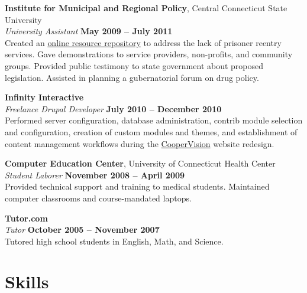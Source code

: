 \documentclass[margin,line]{resume}
\begin{document}
\begin{resume}
    \textbf{Institute for Municipal and Regional Policy}, Central Connecticut State University \vspace{2mm}\\\vspace{1mm}%
    \textsl{University Assistant} \hfill \textbf{May 2009 -- July 2011}\\
    Created an \href{http://www.ctreentry.info}{online resource repository} to address the lack of prisoner reentry services. Gave demonstrations to service providers, non-profits, and community groups. Provided public testimony to state government about proposed legislation. Assisted in planning a gubernatorial forum on drug policy.

    \textbf{Infinity Interactive} \vspace{2mm}\\\vspace{1mm}%
    \textsl{Freelance Drupal Developer} \hfill \textbf{July 2010 -- December 2010}\\
    Performed server configuration, database administration, contrib module selection and configuration, creation of custom modules and themes, and establishment of content management workflows during the \href{http://www.coopervision.com}{CooperVision} website redesign.

    \textbf{Computer Education Center}, University of Connecticut Health Center\vspace{2mm}\\\vspace{1mm}%
    \textsl{Student Laborer} \hfill \textbf{November 2008 -- April 2009}\\
    Provided technical support and training to medical students. Maintained computer classrooms and course-mandated laptops.

    \textbf{Tutor.com}\vspace{2mm}\\\vspace{1mm}%
    \textsl{Tutor} \hfill \textbf{October 2005 -- November 2007}\\
    Tutored high school students in English, Math, and Science.

    \section{\mysidestyle Skills} 


\end{resume}
\end{document}

